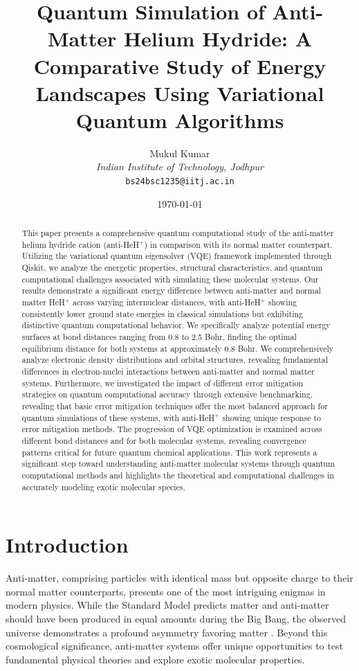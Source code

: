 \documentclass[10pt,twocolumn,a4paper]{article}
\title{\textbf{Quantum Simulation of Anti-Matter Helium Hydride: A Comparative Study of Energy Landscapes Using Variational Quantum Algorithms}}
\author{Mukul Kumar\\
\textit{Indian Institute of Technology, Jodhpur}\\
\texttt{bs24bsc1235@iitj.ac.in}
}
\date{\today}
\begin{document}
\maketitle

\begin{abstract}
This paper presents a comprehensive quantum computational study of the anti-matter helium hydride cation (anti-HeH$^+$) in comparison with its normal matter counterpart. Utilizing the variational quantum eigensolver (VQE) framework implemented through Qiskit, we analyze the energetic properties, structural characteristics, and quantum computational challenges associated with simulating these molecular systems. Our results demonstrate a significant energy difference between anti-matter and normal matter HeH$^+$ across varying internuclear distances, with anti-HeH$^+$ showing consistently lower ground state energies in classical simulations but exhibiting distinctive quantum computational behavior. We specifically analyze potential energy surfaces at bond distances ranging from 0.8 to 2.5 Bohr, finding the optimal equilibrium distance for both systems at approximately 0.8 Bohr. We comprehensively analyze electronic density distributions and orbital structures, revealing fundamental differences in electron-nuclei interactions between anti-matter and normal matter systems. Furthermore, we investigated the impact of different error mitigation strategies on quantum computational accuracy through extensive benchmarking, revealing that basic error mitigation techniques offer the most balanced approach for quantum simulations of these systems, with anti-HeH$^+$ showing unique response to error mitigation methods. The progression of VQE optimization is examined across different bond distances and for both molecular systems, revealing convergence patterns critical for future quantum chemical applications. This work represents a significant step toward understanding anti-matter molecular systems through quantum computational methods and highlights the theoretical and computational challenges in accurately modeling exotic molecular species.
\end{abstract}

\section{Introduction}
Anti-matter, comprising particles with identical mass but opposite charge to their normal matter counterparts, presents one of the most intriguing enigmas in modern physics. While the Standard Model predicts matter and anti-matter should have been produced in equal amounts during the Big Bang, the observed universe demonstrates a profound asymmetry favoring matter \cite{baker2021matter}. Beyond this cosmological significance, anti-matter systems offer unique opportunities to test fundamental physical theories and explore exotic molecular properties.
\end{document}
